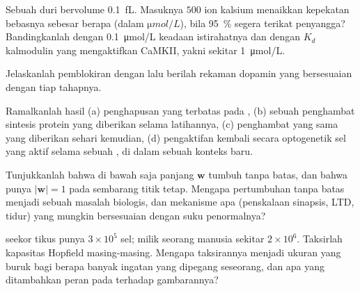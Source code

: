 \begin{exercise}[$\star\star$]\label{exo:b3:learning-memory:7}
Sebuah duri bervolume \qty{0.1}{fL}. Masuknya $500$ ion kalsium
menaikkan kepekatan bebasnya sebesar berapa (dalam $\unit{\micro mol/L}$),
bila \qty{95}{\%} segera terikat penyangga? Bandingkanlah dengan
\qty{0.1}{\micro mol/L} keadaan istirahatnya dan dengan $K_{d}$ kalmodulin
yang mengaktifkan CaMKII, yakni sekitar \qty{1}{\micro mol/L}.
\end{exercise}

\begin{exercise}[$\star\star$]\label{exo:b3:learning-memory:8}
Jelaskanlah pemblokiran dengan  lalu berilah rekaman
dopamin yang bersesuaian dengan tiap tahapnya.
\end{exercise}

\begin{exercise}[$\star\star$]\label{exo:b3:learning-memory:9}
Ramalkanlah hasil (a) penghapusan  yang terbatas pada ,
(b) sebuah penghambat sintesis protein yang diberikan selama latihannya, (c) penghambat yang sama
yang diberikan sehari kemudian, (d) pengaktifan kembali secara optogenetik sel
 yang aktif selama sebuah , di dalam sebuah
konteks baru.
\end{exercise}

\begin{exercise}[$\star\star\star$]\label{exo:b3:learning-memory:10}
Tunjukkanlah bahwa di bawah  saja panjang $\mathbf{w}$ tumbuh
tanpa batas, dan bahwa  punya $|\mathbf{w}| = 1$ pada sembarang titik
tetap. Mengapa pertumbuhan tanpa batas menjadi sebuah masalah biologis, dan mekanisme
apa (penskalaan sinapsis, LTD, tidur) yang mungkin bersesuaian dengan suku
penormalnya?
\end{exercise}

\begin{exercise}[$\star\star\star$]\label{exo:b3:learning-memory:11}
 seekor tikus punya $3\times 10^{5}$ sel; milik seorang manusia sekitar $2\times 10^{6}$.
Taksirlah kapasitas Hopfield masing-masing. Mengapa taksirannya menjadi ukuran
yang buruk bagi berapa banyak ingatan yang dipegang seseorang, dan apa yang ditambahkan peran
 pada  terhadap gambarannya?
\end{exercise}

